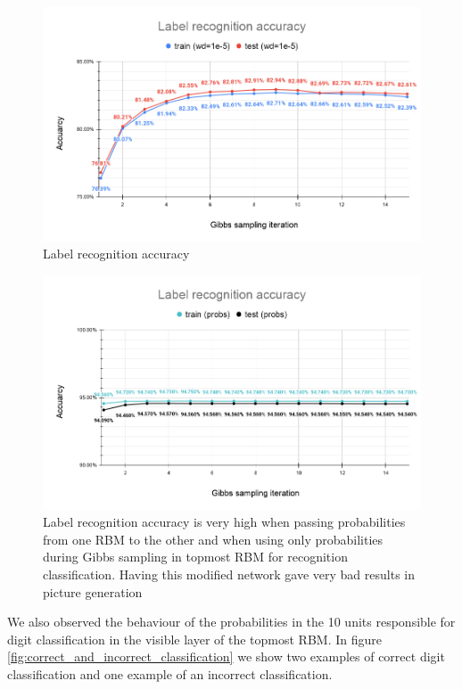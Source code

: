 \documentclass[a4paper]{article}
\begin{document}
\begin{figure}[H]
    \centering
    \includegraphics[width=.98\linewidth]{img/4.2 Label recognition accuracy(1).png}
    \caption{Label recognition accuracy}
    \label{fig:accuracy_convergence}
\end{figure}

\begin{figure}[H]
    \centering
    \includegraphics[width=.98\linewidth]{img/Label recognition accuracy (1).png}
    \caption{Label recognition accuracy is very high when passing probabilities from one RBM to the other and when using only probabilities during Gibbs sampling in topmost RBM for recognition classification. Having this modified network gave very bad results in picture generation}
    \label{fig:accuracy_convergence_probs}
\end{figure}

We also observed the behaviour of the probabilities in the 10 units responsible for digit classification in the visible layer of the topmost RBM. In figure \ref{fig:correct_and_incorrect_classification} we show two examples of correct digit classification and one example of an incorrect classification.
\end{document}
